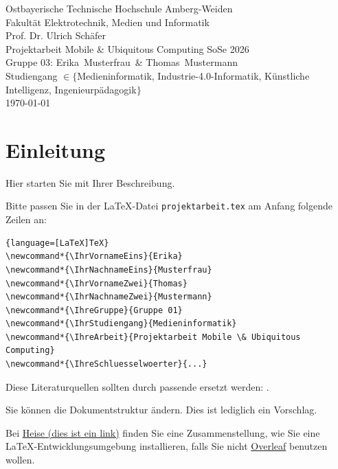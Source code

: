 \documentclass[12pt,oneside]{article}
\newcommand*{\IhrVornameEins}{Erika}
\newcommand*{\IhrNachnameEins}{Musterfrau}
\newcommand*{\IhrVornameZwei}{Thomas}
\newcommand*{\IhrNachnameZwei}{Mustermann}
\newcommand*{\IhreGruppe}{Gruppe 03}
\newcommand*{\IhrStudiengang}{$\in \{$Medieninformatik, Industrie-4.0-Informatik, Künstliche Intelligenz, Ingenieurpädagogik$\}$}
\newcommand*{\IhreArbeit}{Projektarbeit Mobile \& Ubiquitous Computing SoSe 2026}
\newcommand*{\IhreSchluesselwoerter}{ESP32S3, MQTT, IoT, Lagesensor, Node-RED, WLAN}
\newcommand*{\IhrErstpruefer}{Prof. Dr. Ulrich Schäfer}
\begin{document}
\thispagestyle{empty}
\originalTeX
\begin{center}
  \Large
  Ostbayerische Technische Hochschule Amberg-Weiden\\
  Fakultät Elektrotechnik, Medien und Informatik\\[.8cm]
  \large \IhrErstpruefer\\[.8cm]
  \Large \IhreArbeit\\[.8cm]
  \large \IhreGruppe: \IhrVornameEins\ \IhrNachnameEins\ \&
  \IhrVornameZwei\ \IhrNachnameZwei\\[.8cm]
  \large Studiengang \IhrStudiengang\\[.8cm]
  \today\\[2.5cm]
\end{center}


\tableofcontents

\clearpage

%
%

\section{Einleitung}

Hier starten Sie mit Ihrer Beschreibung.

Bitte passen Sie in der \LaTeX-Datei \texttt{projektarbeit.tex} am Anfang folgende 
Zeilen an:
  
\begin{lstlisting}{language=[LaTeX]TeX}
\newcommand*{\IhrVornameEins}{Erika}
\newcommand*{\IhrNachnameEins}{Musterfrau}
\newcommand*{\IhrVornameZwei}{Thomas}
\newcommand*{\IhrNachnameZwei}{Mustermann}
\newcommand*{\IhreGruppe}{Gruppe 01}
\newcommand*{\IhrStudiengang}{Medieninformatik}
\newcommand*{\IhreArbeit}{Projektarbeit Mobile \& Ubiquitous Computing}
\newcommand*{\IhreSchluesselwoerter}{...}
\end{lstlisting}
  
Diese Literaturquellen sollten durch passende ersetzt werden: \cite{Breymann:2020,jabref,Schaefer_Spurk:2010,ct_LaTeX:2005,zotero,ArduinoLanguageReference,wavesharedoku}.

Sie können die Dokumentstruktur ändern. Dies ist lediglich ein Vorschlag.

Bei \href{https://www.heise.de/download/blog/Einfuehrung-in-LaTeX-3599742}{Heise (dies ist ein link)} finden Sie 
eine Zusammenstellung, wie Sie eine \LaTeX-Entwicklungsumgebung installieren, falls Sie nicht
\href{https://www.overleaf.com}{Overleaf} benutzen wollen.

%
%
\end{document}
